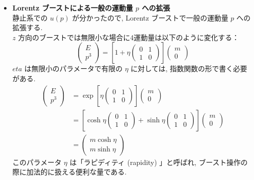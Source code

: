 \documentclass[a4paper,12pt]{article}
\begin{document}
\begin{itemize}
  \item \textbf{Lorentz ブーストによる一般の運動量 $p$ への拡張}\\
  静止系での $u(p)$ が分かったので, Lorentz ブーストで一般の運動量 $p$ への拡張する.\\
  $z$ 方向のブーストでは無限小な場合に4運動量は以下のように変化する：
  \begin{equation*}
    \begin{pmatrix}
    E \\
    p^3
    \end{pmatrix}
    = \left[ 1 + \eta \begin{pmatrix}
      0 & 1 \\
      1 & 0
      \end{pmatrix} \right]
      \begin{pmatrix}
      m \\
      0
      \end{pmatrix}
  \end{equation*}
  $eta$ は無限小のパラメータで有限の $\eta$ に対しては, 指数関数の形で書く必要がある.
  \begin{align*}
    \begin{pmatrix}
    E \\
    p^3
    \end{pmatrix}
    &= \exp \left[ \eta \begin{pmatrix}
      0 & 1 \\
      1 & 0
      \end{pmatrix} \right]
      \begin{pmatrix}
      m \\
      0
      \end{pmatrix}\\
    &= \left[ \cosh \eta \begin{pmatrix}
      0 & 1 \\
      1 & 0
      \end{pmatrix} + \sinh \eta \begin{pmatrix}
      0 & 1 \\
      1 & 0
      \end{pmatrix} \right]
      \begin{pmatrix}
      m \\
      0
      \end{pmatrix}\\
    &= \begin{pmatrix}
    m \cosh \eta \\
    m \sinh \eta
    \end{pmatrix} \tag{3.48}
  \end{align*}
  このパラメータ $\eta$ は「ラピディティ (rapidity) 」と呼ばれ, ブースト操作の際に加法的に扱える便利な量である.


\end{itemize}
\end{document}
